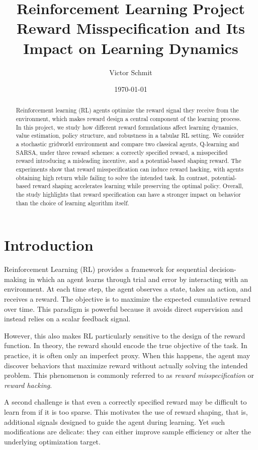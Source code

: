 \documentclass[10pt]{article}
\title{Reinforcement Learning Project\\
\large Reward Misspecification and Its Impact on Learning Dynamics}
\author{Victor Schmit}
\date{\today}
\begin{document}
\maketitle

\begin{abstract}
	Reinforcement learning (RL) agents optimize the reward signal they receive from the environment, which makes reward design a central component of the learning process. In this project, we study how different reward formulations affect learning dynamics, value estimation, policy structure, and robustness in a tabular RL setting. We consider a stochastic gridworld environment and compare two classical agents, Q-learning and SARSA, under three reward schemes: a correctly specified reward, a misspecified reward introducing a misleading incentive, and a potential-based shaping reward. The experiments show that reward misspecification can induce reward hacking, with agents obtaining high return while failing to solve the intended task. In contrast, potential-based reward shaping accelerates learning while preserving the optimal policy. Overall, the study highlights that reward specification can have a stronger impact on behavior than the choice of learning algorithm itself.
\end{abstract}

\tableofcontents
\newpage

\section{Introduction}

Reinforcement Learning (RL) provides a framework for sequential decision-making in which an agent learns through trial and error by interacting with an environment. At each time step, the agent observes a state, takes an action, and receives a reward. The objective is to maximize the expected cumulative reward over time. This paradigm is powerful because it avoids direct supervision and instead relies on a scalar feedback signal.

However, this also makes RL particularly sensitive to the design of the reward function. In theory, the reward should encode the true objective of the task. In practice, it is often only an imperfect proxy. When this happens, the agent may discover behaviors that maximize reward without actually solving the intended problem. This phenomenon is commonly referred to as \emph{reward misspecification} or \emph{reward hacking}.

A second challenge is that even a correctly specified reward may be difficult to learn from if it is too sparse. This motivates the use of reward shaping, that is, additional signals designed to guide the agent during learning. Yet such modifications are delicate: they can either improve sample efficiency or alter the underlying optimization target.
\end{document}
